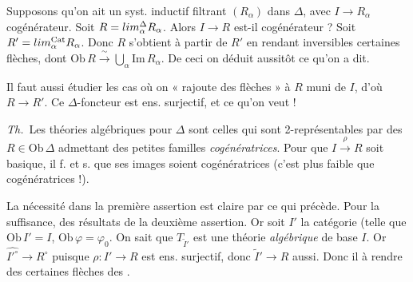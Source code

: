 \documentclass[11pt,a4paper]{article}
\begin{document}
\begin{enumerate}
    Supposons qu'on ait un syst. inductif filtrant
    $(R_{\alpha})$ dans $\Delta$, avec $I \to R_{\alpha}$ cogénérateur.
    Soit $R = \varinjlim_{\alpha}^{\Delta} R_{\alpha}$. Alors $I \to R$
    est-il cogénérateur ? Soit $R' = \varinjlim_{\alpha}^{\mathrm{Cat}}
    R_{\alpha}$.   Donc $R$ s'obtient à partir
    de $R'$ en rendant inversibles certaines flèches, dont $\mathrm{Ob}\,
    R \xrightarrow{\ \sim\ } \bigcup_{\alpha} \mathrm{Im}\, R_{\alpha}$.
    De ceci on déduit aussitôt ce qu'on a dit.

    Il faut aussi étudier les cas où on « rajoute des flèches » à $R$
    muni de $I$, d'où $R \to R'$. Ce $\Delta$-foncteur \struck{\ill{}}
    est ens. surjectif, et \ill{} ce qu'on veut !
\end{enumerate}

\emph{Th.}\ Les théories algébriques pour $\Delta$ sont celles qui
sont 2-représentables par des $R \in \mathrm{Ob}\,\Delta$ admettant des
petites familles  \emph{cogénératrices}. Pour que
$I \xrightarrow{\ \rho\ } R$ \struck{\ill{}}  soit
\supplied{$\Delta$-}basique, il f. et s. que ses images soient cogénératrices (c'est plus faible que 
cogénératrices !).

La nécessité dans la première assertion est claire par ce qui précède.
Pour la suffisance,   des
résultats de la deuxième assertion. Or soit $I'$ la catégorie  (telle que $\mathrm{Ob}\,I' = I$,
$\mathrm{Ob}\,\varphi = \varphi_{0}$.  On sait que
$T_{\tilde{I}'}$ est une théorie \emph{algébrique} de base $I$. Or
$\widehat{I'^{\circ}} \to R^{\circ}$ 
puisque $\rho : I' \to R$ est ens. surjectif, donc $\tilde{I}' \to R$
aussi. Donc il  \struck{\ill{}} \ill{} à rendre
 des \struck{\ill{}} certaines flèches des .
\end{document}
